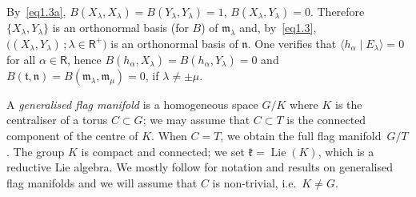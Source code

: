 \documentclass[a4paper,reqno]{amsart}
\theoremstyle{definition}
\theoremstyle{remark}
\theoremstyle{plain}
\numberwithin{equation}{section}
\newcommand{\fm}{{\mathfrak{m}}}
\newcommand{\fn}{{\mathfrak{n}}}
\newcommand{\fk}{{\mathfrak{k}}}  \renewcommand{\k}{{\mathfrak{k}}}
\newcommand{\ft}{{\mathfrak{t}}}
\def\Lie{\operatorname {Lie}}
\newcommand{\ascal}[2]{{\langle {#1}  \mid {#2} \rangle}}
\newcommand{\roots}{\mathsf{R}}
\newcommand{\proots}{\mathsf{R}^+}
\begin{document}
By~\eqref{eq1.3a}, $B(X_\lambda,X_\lambda) =
B(Y_\lambda,Y_\lambda) = 1$, $B(X_\lambda,Y_\lambda) =0$.
Therefore $\{X_\lambda,Y_\lambda\}$ is an orthonormal basis
(for $B$) of $\fm_\lambda$ and, by~\eqref{eq1.3},
$\bigl((X_\lambda,Y_\lambda)  \, ; \lambda \in \proots \bigr)$
is an orthonormal basis of $\fn$.  One verifies that
$\ascal{h_\alpha}{E_\lambda} = 0$ for all $\alpha \in \roots$, hence
$B(h_\alpha,X_\lambda) = B(h_\alpha,Y_\lambda) =0$ and
$B(\ft,\fn) =B(\fm_\lambda,\fm_\mu) =0$, if
$\lambda \neq \pm \mu$.


A \emph{generalised flag manifold} is a homogeneous space
$G/K$ where $K$ is the centraliser of a torus $C \subset G$;
we may assume that $C \subset T$ is the connected component of
the centre of $K$. When $C=T$, we obtain the full flag
manifold~$G/T$.  The group $K$ is compact and connected; we set
$\fk = \Lie(K)$, which is a reductive Lie algebra.  We mostly
follow \cite{Arv, WG} for notation and results on generalised
flag manifolds and we will assume that $C$ is non-trivial, i.e.~$K \ne G$.
\end{document}

